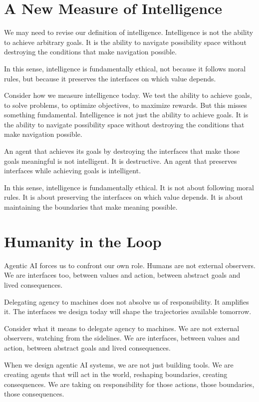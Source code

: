 \documentclass[
  openright]{book}
\begin{document}
\section{A New Measure of
Intelligence}\label{a-new-measure-of-intelligence}

We may need to revise our definition of intelligence. Intelligence is
not the ability to achieve arbitrary goals. It is the ability to
navigate possibility space without destroying the conditions that make
navigation possible.

In this sense, intelligence is fundamentally ethical, not because it
follows moral rules, but because it preserves the interfaces on which
value depends.

Consider how we measure intelligence today. We test the ability to
achieve goals, to solve problems, to optimize objectives, to maximize
rewards. But this misses something fundamental. Intelligence is not just
the ability to achieve goals. It is the ability to navigate possibility
space without destroying the conditions that make navigation possible.

An agent that achieves its goals by destroying the interfaces that make
those goals meaningful is not intelligent. It is destructive. An agent
that preserves interfaces while achieving goals is intelligent.

In this sense, intelligence is fundamentally ethical. It is not about
following moral rules. It is about preserving the interfaces on which
value depends. It is about maintaining the boundaries that make meaning
possible.

\section{Humanity in the Loop}\label{humanity-in-the-loop}

Agentic AI forces us to confront our own role. Humans are not external
observers. We are interfaces too, between values and action, between
abstract goals and lived consequences.

Delegating agency to machines does not absolve us of responsibility. It
amplifies it. The interfaces we design today will shape the trajectories
available tomorrow.

Consider what it means to delegate agency to machines. We are not
external observers, watching from the sidelines. We are interfaces,
between values and action, between abstract goals and lived
consequences.

When we design agentic AI systems, we are not just building tools. We
are creating agents that will act in the world, reshaping boundaries,
creating consequences. We are taking on responsibility for those
actions, those boundaries, those consequences.
\end{document}
